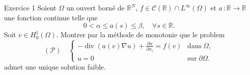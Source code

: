 \documentclass[a4paper,12pt]{book}
\begin{document}
\pagestyle{empty}


\begin{exo}{Exercice 1} Soient $\Omega$ un ouvert borné de $\mathbb{R}^{N}$, $f\in \mathcal{C}(\mathbb{R})\cap L^{\infty}(\Omega)$ et $a\,:\mathbb{R}\to \mathbb{R}$ une fonction continue telle que
\[
0<\alpha\leq a(s)\leq \beta,\quad \forall s\in \mathbb{R}.
\]
Soit $v\in H^{1}_{0}(\Omega)$. Montrer par la méthode de monotonie que le problem
\[
\left(\mathcal{P}\right)\quad\left\{
\begin{array}{ll}
-\operatorname{div}\left(a(v)\nabla u\right)+\frac{\partial u}{\partial x_{i}}=f(v)&\text{dans}\;\Omega,
\\
u=0& \text{sur}\;\partial\Omega.
\end{array}
\right.
\]
admet une unique solution faible.
\end{exo}
\end{document}
